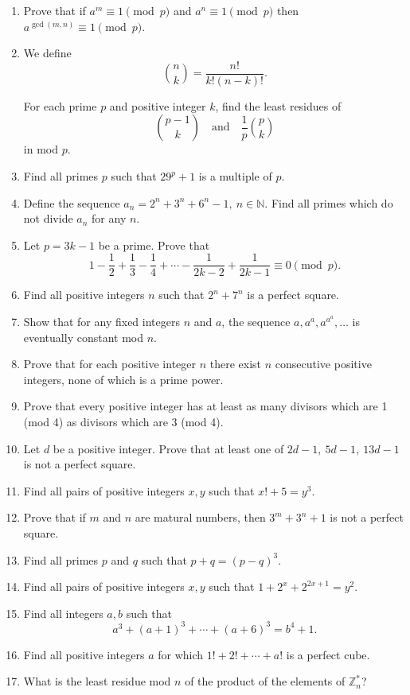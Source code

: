 \documentclass{article}
\begin{document}
\begin{enumerate}
  \item Prove that if $a^m\equiv 1\pmod p$ and $a^n\equiv 1\pmod p$ then
    $a^{\gcd(m,n)}\equiv 1\pmod p$.
  \item 
    We define
    \[\binom nk=\frac{n!}{k!(n-k)!}.\]

    For each prime $p$ and positive integer $k$, find the least residues of 
    \[\binom {p-1}k\quad\text{and}\quad\frac1p\binom pk\] in mod $p$.
  \item Find all primes $p$ such that $29^p+1$ is a multiple of $p$.
  \item Define the sequence $a_n=2^n+3^n+6^n-1,\ n\in\mathbb N$.
    Find all primes which do not divide $a_n$ for any $n$.
  \item Let $p=3k-1$ be a prime. Prove that
    \[1-\frac12+\frac13-\frac14+\cdots-\frac1{2k-2}+\frac1{2k-1}\equiv 0\pmod
    p.\]
  \item Find all positive integers $n$ such that $2^n+7^n$ is a perfect square.
  \item Show that for any fixed integers $n$ and $a$, the sequence
    $a,a^a,a^{a^a},\ldots$ is eventually constant mod $n$.
  \item Prove that for each positive integer $n$ there exist $n$ consecutive
    positive integers, none of which is a prime power.
  \item Prove that every positive integer has at least as many divisors which
    are 1 (mod 4) as divisors which are 3 (mod 4).
  \item Let $d$ be a positive integer. Prove that at least one of $2d-1,\ 5d-1,\
    13d-1$ is not a perfect square.
  \item Find all pairs of positive integers $x,y$ such that $x!+5=y^3$.
  \item Prove that if $m$ and $n$ are matural numbers, then $3^m+3^n+1$ is not a
    perfect square.
  \item Find all primes $p$ and $q$ such that $p+q=(p-q)^3$.
  \item Find all pairs of positive integers $x,y$ such that
    $1+2^x+2^{2x+1}=y^2$.
  \item Find all integers $a,b$ such that
    \[a^3+(a+1)^3+\cdots+(a+6)^3=b^4+1.\]
  \item Find all positive integers $a$ for which $1!+2!+\cdots+a!$ is a perfect
    cube.
  \item What is the least residue mod $n$ of the product of the elements of
    $\mathbb Z_n^*$?
\end{enumerate}
\end{document}
